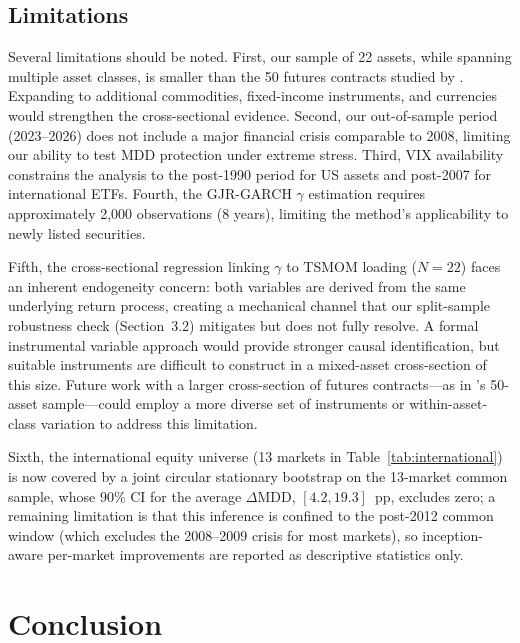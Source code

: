 \subsection{Limitations}

Several limitations should be noted. First, our sample of 22 assets, while spanning multiple asset classes, is smaller than the 50 futures contracts studied by \citet{hood2025}. Expanding to additional commodities, fixed-income instruments, and currencies would strengthen the cross-sectional evidence. Second, our out-of-sample period (2023--2026) does not include a major financial crisis comparable to 2008, limiting our ability to test MDD protection under extreme stress. Third, VIX availability constrains the analysis to the post-1990 period for US assets and post-2007 for international ETFs. Fourth, the GJR-GARCH $\gamma$ estimation requires approximately 2,000 observations (8 years), limiting the method's applicability to newly listed securities.

Fifth, the cross-sectional regression linking $\gamma$ to TSMOM loading ($N = 22$) faces an inherent endogeneity concern: both variables are derived from the same underlying return process, creating a mechanical channel that our split-sample robustness check (Section~3.2) mitigates but does not fully resolve. A formal instrumental variable approach would provide stronger causal identification, but suitable instruments are difficult to construct in a mixed-asset cross-section of this size. Future work with a larger cross-section of futures contracts---as in \citet{hood2025}'s 50-asset sample---could employ a more diverse set of instruments or within-asset-class variation to address this limitation.

Sixth, the international equity universe (13 markets in Table~\ref{tab:international}) is now covered by a joint circular stationary bootstrap on the 13-market common sample, whose 90\% CI for the average $\Delta$MDD, $[4.2, 19.3]$~pp, excludes zero; a remaining limitation is that this inference is confined to the post-2012 common window (which excludes the 2008--2009 crisis for most markets), so inception-aware per-market improvements are reported as descriptive statistics only.


\section{Conclusion}

